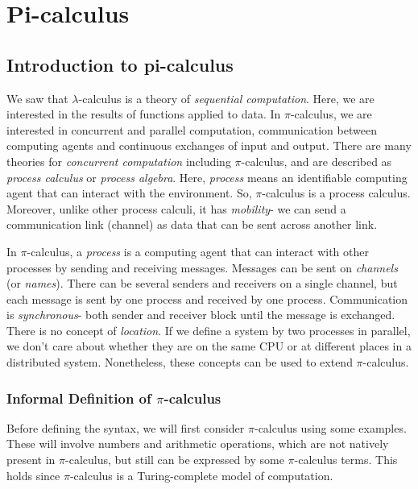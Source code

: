 \documentclass[a4paper, openany]{memoir}
\theoremstyle{definition}
\begin{document}
    \chapter{Pi-calculus}
    \section{Introduction to pi-calculus}
    We saw that $\lambda$-calculus is a theory of \emph{sequential computation}. Here, we are interested in the results of functions applied to data. In $\pi$-calculus, we are interested in concurrent and parallel computation, communication between computing agents and continuous exchanges of input and output. There are many theories for \emph{concurrent computation} including $\pi$-calculus, and are described as \emph{process calculus} or \emph{process algebra}. Here, \emph{process} means an identifiable computing agent that can interact with the environment. So, $\pi$-calculus is a process calculus. Moreover, unlike other process calculi, it has \emph{mobility}- we can send a communication link (channel) as data that can be sent across another link.

    In $\pi$-calculus, a \emph{process} is a computing agent that can interact with other processes by sending and receiving messages. Messages can be sent on \emph{channels} (or \emph{names}). There can be several senders and receivers on a single channel, but each message is sent by one process and received by one process. Communication is \emph{synchronous}- both sender and receiver block until the message is exchanged. There is no concept of \emph{location}. If we define a system by two processes in parallel, we don't care about whether they are on the same CPU or at different places in a distributed system. Nonetheless, these concepts can be used to extend $\pi$-calculus.

    \subsection{Informal Definition of $\pi$-calculus}
    Before defining the syntax, we will first consider $\pi$-calculus using some examples. These will involve numbers and arithmetic operations, which are not natively present in $\pi$-calculus, but still can be expressed by some $\pi$-calculus terms. This holds since $\pi$-calculus is a Turing-complete model of computation. 
\end{document}
